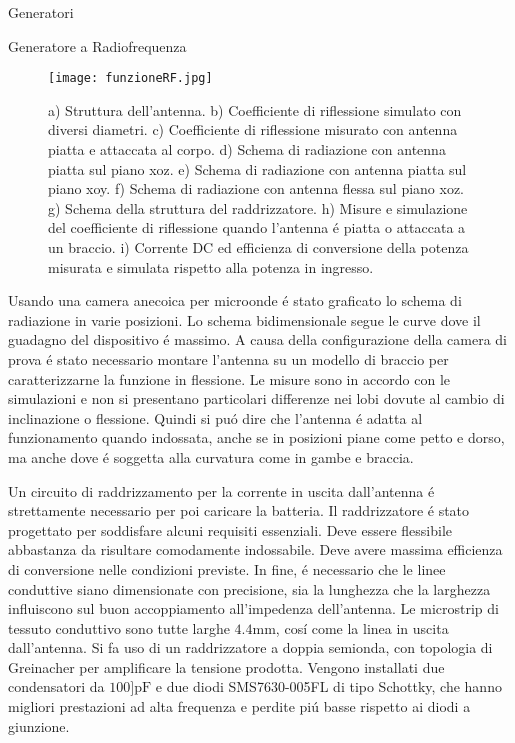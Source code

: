 \begin{section}{Generatori}
\begin{subsection}{Generatore a Radiofrequenza}
        \begin{figure}[hbt!]
            \texttt{[image: funzioneRF.jpg]}
            \centering
            \caption{a) Struttura dell'antenna. b) Coefficiente di riflessione simulato con diversi diametri. c) Coefficiente di riflessione misurato con antenna piatta e attaccata al corpo. d) Schema di radiazione con antenna piatta sul piano xoz. e) Schema di radiazione con antenna piatta sul piano xoy. f) Schema di radiazione con antenna flessa sul piano xoz. g) Schema della struttura del raddrizzatore. h) Misure e simulazione del coefficiente di riflessione quando l'antenna \'e piatta o attaccata a un braccio. i) Corrente DC ed efficienza di conversione della potenza misurata e simulata rispetto alla potenza in ingresso.\cite{kouWearableAllFabricHybrid2024}}
            \label{fig:funzioneRF}
        \end{figure}
        
        Usando una camera anecoica per microonde \'e stato graficato lo schema di radiazione in varie posizioni. Lo schema bidimensionale segue le curve dove il guadagno del dispositivo \'e massimo. A causa della configurazione della camera di prova \'e stato necessario montare l'antenna su un modello di braccio per caratterizzarne la funzione in flessione. Le misure sono in accordo con le simulazioni e non si presentano particolari differenze nei lobi dovute al cambio di inclinazione o flessione. Quindi si pu\'o dire che l'antenna \'e adatta al funzionamento quando indossata, anche se in posizioni piane come petto e dorso, ma anche dove \'e soggetta alla curvatura come in gambe e braccia.

        Un circuito di raddrizzamento per la corrente in uscita dall'antenna \'e strettamente necessario per poi caricare la batteria. Il raddrizzatore \'e stato progettato per soddisfare alcuni requisiti essenziali. Deve essere flessibile abbastanza da risultare comodamente indossabile. Deve avere massima efficienza di conversione nelle condizioni previste. In fine, \'e necessario che le linee conduttive siano dimensionate con precisione, sia la lunghezza che la larghezza influiscono sul buon accoppiamento all'impedenza dell'antenna. Le microstrip di tessuto conduttivo sono tutte larghe \(4.4\mathrm{mm}\), cos\'i come la linea in uscita dall'antenna. Si fa uso di un raddrizzatore a doppia semionda, con topologia di Greinacher per amplificare la tensione prodotta. Vengono installati due condensatori da \(100]\mathrm{pF}\) e due diodi SMS7630-005FL di tipo Schottky, che hanno migliori prestazioni ad alta frequenza e perdite pi\'u basse rispetto ai diodi a giunzione. 


\end{subsection}
\end{section}
